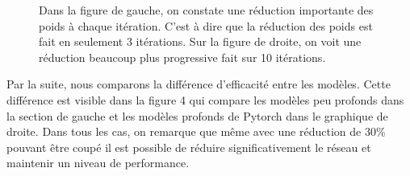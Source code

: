 \documentclass[12pt]{article}
\begin{document}
\begin{figure}[H]
\begin{subfigure}[b]{0.5\textwidth}
		\label{fig:pruneratioslow}
	\end{subfigure}
	\caption{Dans la figure de gauche, on constate une réduction importante des poids à chaque itération. C'est à dire que la réduction des poids est fait en seulement 3 itérations. Sur la figure de droite, on voit une réduction beaucoup plus progressive fait sur 10 itérations.}
\end{figure}

Par la suite, nous comparons la différence d’efficacité entre les modèles. Cette différence est visible dans la figure 4 qui compare les modèles peu profonds dans la section de gauche et les modèles profonds de Pytorch dans le graphique de droite. Dans tous les cas, on remarque que même avec une réduction de 30\% pouvant être coupé il est possible de réduire significativement le réseau et maintenir un niveau de performance.
\end{document}
